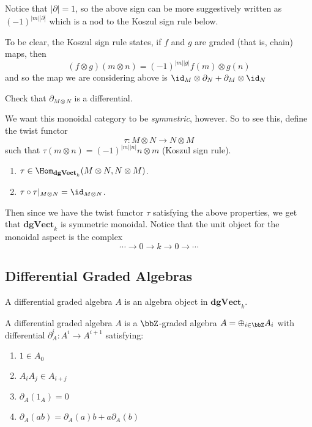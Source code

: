 \documentclass[12pt]{article}
\newcommand*{\dgVectk}{\mathbf{dgVect}_k}
\begin{document}
\begin{rmk}
	Notice that $|\partial|=1$, so the above sign can be more suggestively written as $(-1)^{|m||\partial|}$
	which is a nod to the Koszul sign rule below.

	To be clear, the Koszul sign rule states, if $f$ and $g$ are graded (that is, chain) maps, then
	\[(f\otimes g)(m\otimes n)=(-1)^{|m||g|}f(m)\otimes g(n)\]
	and so the map we are considering above is $\id_M\otimes \partial_N+\partial_M\otimes \id_N$
\end{rmk}
\begin{prob}
	Check that $\partial_{M\otimes N}$ is a differential.
\end{prob}

We want this monoidal category to be \textit{symmetric}, however. So to see this, define the twist functor
\[\tau:M\otimes N\to N\otimes M\]
such that $\tau(m\otimes n)=(-1)^{|m||n|}n\otimes m$ (Koszul sign rule).
\begin{lem}
	\begin{enumerate}
		\item $\tau\in\Hom_{\dgVectk}(M\otimes N,N\otimes M)$. 
		\item $\tau\circ\tau|_{M\otimes N}=\id_{M\otimes N}$.
	\end{enumerate}
\end{lem}

Then since we have the twist functor $\tau$ satisfying the above properties, we get that $\dgVectk$ is 
symmetric monoidal. Notice that the unit object for the monoidal aspect is the complex
\[\cdots\to 0\to k\to 0\to\cdots\]

\subsection{Differential Graded Algebras}
\begin{defn}
	A differential graded algebra $A$ is an algebra object in $\dgVectk$.
\end{defn}
\begin{defn}
	A differential graded algebra $A$ is a $\bbZ$-graded algebra $A=\oplus_{i\in \bbZ}A_i$ with differential
	$\partial_A^i:A^i\to A^{i+1}$ satisfying:
	\begin{enumerate}
		\item $1\in A_0$
		\item $A_iA_j\in A_{i+j}$
		\item $\partial_A(1_A)=0$
		\item $\partial_A(ab)=\partial_A(a)b+a\partial_A(b)$
	\end{enumerate}
\end{defn}
\end{document}
